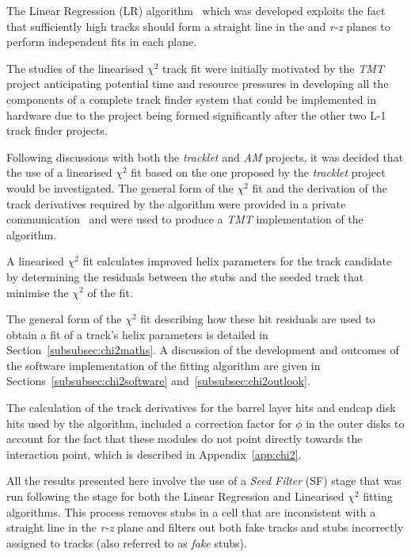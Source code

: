 The Linear Regression (LR) algorithm~\cite{TMTT_FLP} which was developed exploits the fact that sufficiently high \pT tracks should form a straight line in the \emph{\rphi} and \emph{r-z} planes to perform independent fits in each plane.

The studies of the linearised $\chi^{2}$ track fit were initially motivated by the \emph{TMT} project anticipating potential time and resource pressures in developing all the components of a complete track finder system that could be implemented in hardware due to the project being formed significantly after the other two L-1 track finder projects.

Following discussions with both the \emph{tracklet} and \emph{AM} projects, it was decided that the use of a linearised $\chi^{2}$ fit based on the one proposed by the \emph{tracklet} project would be investigated.
The general form of the $\chi^{2}$ fit and the derivation of the track derivatives required by the algorithm were provided in a private communication~\cite{CMS_DN-14-043} and were used to produce a \emph{TMT} implementation of the algorithm.

A linearised $\chi^{2}$ fit calculates improved helix parameters for the track candidate by determining the  residuals between the stubs and the seeded track that minimise the $\chi^{2}$ of the fit.

The general form of the $\chi^{2}$ fit describing how these hit residuals are used to obtain a fit of a track's helix parameters is detailed in Section~\ref{subsubsec:chi2maths}.
A discussion of the development and outcomes of the software implementation of the fitting algorithm are given in Sections~\ref{subsubsec:chi2software} and~\ref{subsubsec:chi2outlook}.


The calculation of the track derivatives for the barrel layer hits and endcap disk hits used by the algorithm, included a correction factor for $\phi$ in the outer disks to account for the fact that these modules do not point directly towards the interaction point, which is described in Appendix~\ref{app:chi2}.

All the results presented here involve the use of a \emph{Seed Filter} (SF) stage that was run following the \HT stage for both the Linear Regression and Linearised $\chi^{2}$ fitting algorithms.
This process removes stubs in a \HT cell that are inconsistent with a straight line in the \emph{r-z} plane and filters out both fake tracks and stubs incorrectly assigned to tracks (also referred to as \emph{fake} stubs).

